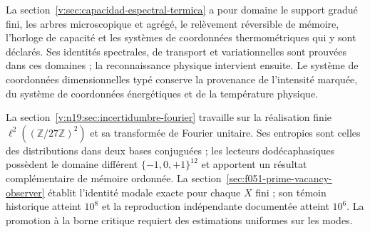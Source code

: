 La section~\ref{v:sec:capacidad-espectral-termica} a pour domaine le
support gradué fini, les arbres microscopique et agrégé, le
relèvement réversible de mémoire, l’horloge de capacité et les systèmes de coordonnées
thermométriques qui y sont déclarés. Ses identités spectrales, de transport et
variationnelles sont prouvées dans ces domaines ; la reconnaissance physique
intervient ensuite. Le système de coordonnées dimensionnelles typé conserve la provenance de
l’intensité marquée, du système de coordonnées énergétiques et de la température physique.

La section~\ref{v:n19:sec:incertidumbre-fourier} travaille sur la
réalisation finie \(\ell^2((\mathbb Z/27\mathbb Z)^2)\) et sa
transformée de Fourier unitaire. Ses entropies sont celles des distributions dans deux bases
conjuguées ; les lecteurs dodécaphasiques possèdent le domaine différent
\(\{-1,0,+1\}^{12}\) et apportent un résultat complémentaire de mémoire
ordonnée. La section~\ref{sec:f051-prime-vacancy-observer} établit
l’identité modale exacte pour chaque \(X\) fini ; son témoin historique atteint
\(10^8\) et la reproduction indépendante documentée atteint \(10^6\).
La promotion à la borne critique requiert des estimations uniformes sur les modes.
